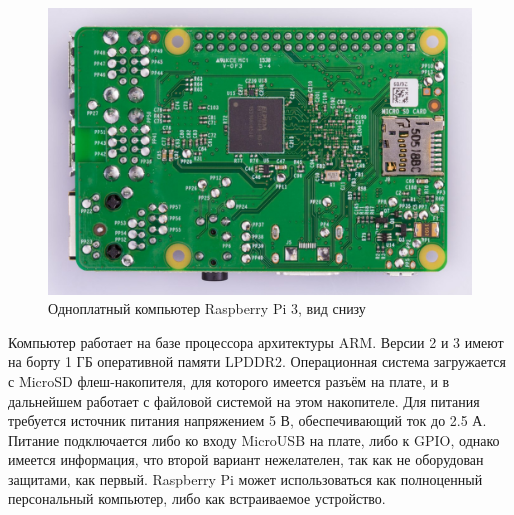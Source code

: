 \documentclass[14pt,russian,a4paper]{extarticle}
\begin{document}
\begin{figure}[h!]
    \centerline{\includegraphics[width=400pt]{media/rpi_layout_back.jpg}}
    \caption{Одноплатный компьютер Raspberry Pi 3, вид снизу}
    \label{fig:rpi_back}
\end{figure}

Компьютер работает на базе процессора архитектуры ARM\cite{arm}. Версии 2 и 3 имеют на борту 1 ГБ оперативной памяти LPDDR2.
Операционная система загружается с MicroSD флеш-накопителя, для которого имеется разъём на плате, и в дальнейшем работает с файловой системой на этом накопителе.
\newline
Для питания требуется источник питания напряжением 5 В, обеспечивающий ток до 2.5 А. Питание подключается либо ко входу MicroUSB на плате, либо к GPIO, однако имеется информация, что второй вариант нежелателен, так как не оборудован защитами, как первый\cite{raspberry_pi_power}.
\newline
Raspberry Pi может использоваться как полноценный персональный компьютер, либо как встраиваемое устройство.
\end{document}
